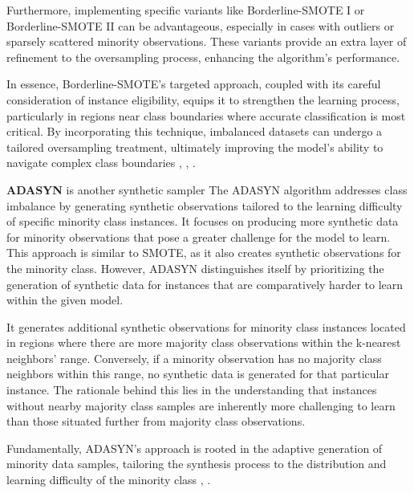 Furthermore, implementing specific variants like Borderline-SMOTE I or Borderline-SMOTE II can be advantageous, especially in cases with outliers or sparsely scattered minority observations. These variants provide an extra layer of refinement to the oversampling process, enhancing the algorithm's performance.

In essence, Borderline-SMOTE's targeted approach, coupled with its careful consideration of instance eligibility, equips it to strengthen the learning process, particularly in regions near class boundaries where accurate classification is most critical. By incorporating this technique, imbalanced datasets can undergo a tailored oversampling treatment, ultimately improving the model's ability to navigate complex class boundaries \cite{Nguyen2009}, \cite{Gupta2018}, \cite{Brandt2020}.




\textbf{ADASYN} is another synthetic sampler 
The ADASYN algorithm addresses class imbalance by generating synthetic observations tailored to the learning difficulty of specific minority class instances. It focuses on producing more synthetic data for minority observations that pose a greater challenge for the model to learn. This approach is similar to SMOTE, as it also creates synthetic observations for the minority class. However, ADASYN distinguishes itself by prioritizing the generation of synthetic data for instances that are comparatively harder to learn within the given model.

It generates additional synthetic observations for minority class instances located in regions where there are more majority class observations within the k-nearest neighbors' range. Conversely, if a minority observation has no majority class neighbors within this range, no synthetic data is generated for that particular instance. The rationale behind this lies in the understanding that instances without nearby majority class samples are inherently more challenging to learn than those situated further from majority class observations.

Fundamentally, ADASYN's approach is rooted in the adaptive generation of minority data samples, tailoring the synthesis process to the distribution and learning difficulty of the minority class \cite{Brandt2020}, \cite{He2008}.









